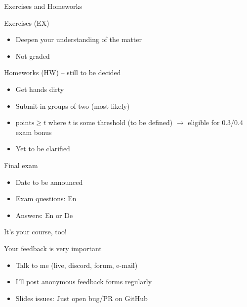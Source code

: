 \documentclass[12pt,aspectratio=169,handout]{beamer}
\begin{document}
\begin{frame}{Exercises and Homeworks}
	
Exercises (EX)

\begin{itemize}
	\item Deepen your understanding of the matter
	\item Not graded
\end{itemize}

Homeworks (HW) -- still to be decided

\begin{itemize}
	\item Get hands dirty
	\item Submit in groups of two (most likely)
	\item $\mathrm{points} \geq t$ where $t$ is some threshold (to be defined) $\to$ eligible for 0.3/0.4 exam bonus
	\item Yet to be clarified
\end{itemize}

\end{frame}

\begin{frame}{Final exam}
	
	
\begin{itemize}
\item Date to be announced
\item Exam questions: En
\item Answers: En or De
\end{itemize}

\end{frame}



\begin{frame}{It's your course, too!}
	
Your feedback is very important

\begin{itemize}
	\item Talk to me (live, discord, forum, e-mail)
	\item I'll post anonymous feedback forms regularly
	\item Slides issues: Just open bug/PR on GitHub
\end{itemize}


\end{frame}
\end{document}
